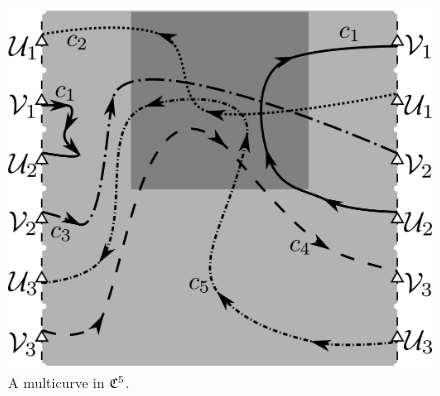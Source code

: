 \begin{figure}\centering
 \includegraphics[scale=0.7]{figures/defcCm.png}
 \caption{A multicurve in $\mathfrak{C}^5$.}
\label{fig:defcCm}
\end{figure}


